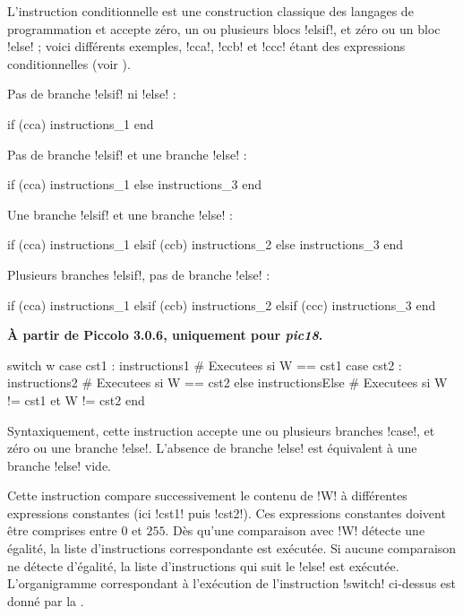 L'instruction conditionnelle est une construction classique des langages de programmation et accepte zéro, un ou plusieurs blocs \pic!elsif!, et zéro ou un bloc \pic!else! ; voici différents exemples, \pic!cca!, \pic!ccb! et \pic!ccc! étant des expressions conditionnelles (voir ).


Pas de branche \pic!elsif! ni \pic!else! :
\begin{piccolo}
if (cca)
  instructions_1
end
\end{piccolo}

Pas de branche \pic!elsif! et une branche \pic!else! :
\begin{piccolo}
if (cca)
  instructions_1
else
  instructions_3
end
\end{piccolo}

Une branche \pic!elsif! et une branche \pic!else! :
\begin{piccolo}
if (cca)
  instructions_1
elsif (ccb)
  instructions_2
else
  instructions_3
end
\end{piccolo}

Plusieurs branches \pic!elsif!, pas de branche \pic!else! :
\begin{piccolo}
if (cca)
  instructions_1
elsif (ccb)
  instructions_2
elsif (ccc)
  instructions_3
end
\end{piccolo}






\textbf{À partir de Piccolo 3.0.6, uniquement pour \emph{pic18}.}

\begin{piccolo}
switch w
case cst1 :
  instructions1 # Executees si W == cst1
case cst2 :
  instructions2 # Executees si W == cst2
else
  instructionsElse # Executees si W != cst1 et W != cst2
end
\end{piccolo}

Syntaxiquement, cette instruction accepte une ou plusieurs branches \pic!case!, et zéro ou une branche \pic!else!. L'absence de branche \pic!else! est équivalent à une branche \pic!else! vide.

Cette instruction compare successivement le contenu de \pic!W! à différentes expressions constantes (ici \pic!cst1! puis \pic!cst2!). Ces expressions constantes doivent être comprises entre $0$ et $255$. Dès qu'une comparaison avec \pic!W! détecte une égalité, la liste d'instructions correspondante est exécutée. Si aucune comparaison ne détecte d'égalité, la liste d'instructions qui suit le \pic!else! est exécutée. L'organigramme correspondant à l'exécution de l'instruction \pic!switch! ci-dessus est donné par la .

